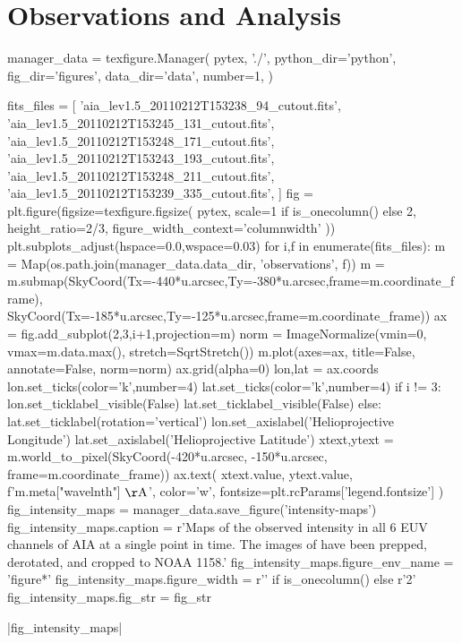 \section{Observations and Analysis}\label{observations}

\begin{pycode}
manager_data = texfigure.Manager(
    pytex, './',
    python_dir='python',
    fig_dir='figures',
    data_dir='data',
    number=1,
)
\end{pycode}

\begin{pycode}
fits_files = [
    'aia_lev1.5_20110212T153238_94_cutout.fits',
    'aia_lev1.5_20110212T153245_131_cutout.fits',
    'aia_lev1.5_20110212T153248_171_cutout.fits',
    'aia_lev1.5_20110212T153243_193_cutout.fits',
    'aia_lev1.5_20110212T153248_211_cutout.fits',
    'aia_lev1.5_20110212T153239_335_cutout.fits',
]
fig = plt.figure(figsize=texfigure.figsize(
    pytex,
    scale=1 if is_onecolumn() else 2,
    height_ratio=2/3,
    figure_width_context='columnwidth'
))
plt.subplots_adjust(hspace=0.0,wspace=0.03)
for i,f in enumerate(fits_files):
    m = Map(os.path.join(manager_data.data_dir, 'observations', f))
    m = m.submap(SkyCoord(Tx=-440*u.arcsec,Ty=-380*u.arcsec,frame=m.coordinate_frame),
                 SkyCoord(Tx=-185*u.arcsec,Ty=-125*u.arcsec,frame=m.coordinate_frame))
    ax = fig.add_subplot(2,3,i+1,projection=m)
    norm = ImageNormalize(vmin=0, vmax=m.data.max(), stretch=SqrtStretch())
    m.plot(axes=ax, title=False, annotate=False, norm=norm)
    ax.grid(alpha=0)
    lon,lat = ax.coords
    lon.set_ticks(color='k',number=4)
    lat.set_ticks(color='k',number=4)
    if i != 3:
        lon.set_ticklabel_visible(False)
        lat.set_ticklabel_visible(False)
    else:
        lat.set_ticklabel(rotation='vertical')
        lon.set_axislabel('Helioprojective Longitude')
        lat.set_axislabel('Helioprojective Latitude')
    xtext,ytext = m.world_to_pixel(SkyCoord(-420*u.arcsec, -150*u.arcsec, frame=m.coordinate_frame))
    ax.text(
        xtext.value, ytext.value,
        f'{m.meta["wavelnth"]} $\mathrm{{\AA}}$',
        color='w',
        fontsize=plt.rcParams['legend.fontsize']
    )
fig_intensity_maps = manager_data.save_figure('intensity-maps')
fig_intensity_maps.caption = r'Maps of the observed intensity in all 6 EUV channels of AIA at a single point in time. The images of have been prepped, derotated, and cropped to \AR{} NOAA 1158.'
fig_intensity_maps.figure_env_name = 'figure*'
fig_intensity_maps.figure_width = r'\columnwidth' if is_onecolumn() else r'2\columnwidth'
fig_intensity_maps.fig_str = fig_str
\end{pycode}
|fig_intensity_maps|


